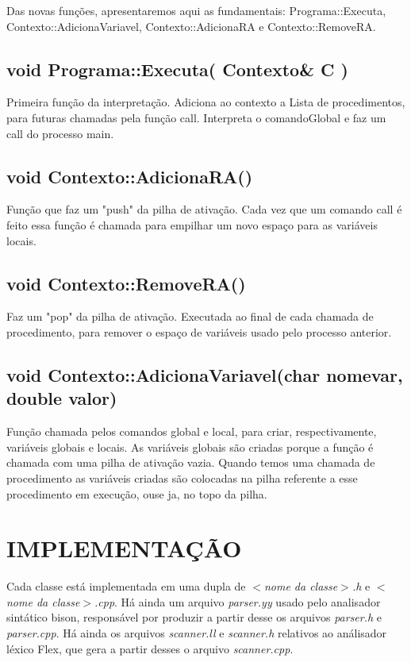 \documentclass[12pt]{article}
\begin{document}
Das novas funções, apresentaremos aqui as fundamentais: Programa::Executa, Contexto::AdicionaVariavel, Contexto::AdicionaRA e Contexto::RemoveRA.

\subsection{void Programa::Executa( Contexto\& C )}

Primeira função da interpretação. Adiciona ao contexto a Lista de procedimentos, para futuras chamadas pela função call. Interpreta o comandoGlobal e faz um call do processo main.


\subsection{void Contexto::AdicionaRA()}

Função que faz um "push" da pilha de ativação. Cada vez que um comando call é feito essa função é chamada para empilhar um novo espaço para as variáveis locais.

\subsection{void Contexto::RemoveRA()}

Faz um "pop" da pilha de ativação. Executada ao final de cada chamada de procedimento, para remover o espaço de variáveis usado pelo processo anterior.

\subsection{void Contexto::AdicionaVariavel(char nomevar, double valor)}

Função chamada pelos comandos global e local, para criar, respectivamente, variáveis globais e locais. As variáveis globais são criadas porque a função é chamada com uma pilha de ativação vazia. Quando temos uma chamada de procedimento as variáveis criadas são colocadas na pilha referente a esse procedimento em execução, ouse ja, no topo da pilha.

\section{IMPLEMENTAÇÃO}

Cada classe está implementada em uma dupla de \textit{$<$nome da classe$>$.h} e
\textit{$<$nome da classe$>$.cpp}. Há ainda um arquivo \textit{parser.yy} usado pelo
analisador sintático bison, responsável por produzir a partir desse os arquivos
\textit{parser.h} e \textit{parser.cpp}. Há ainda os arquivos \textit{scanner.ll} e \textit{scanner.h} relativos ao análisador léxico Flex, que gera a partir desses o arquivo \textit{scanner.cpp}.
\end{document}
